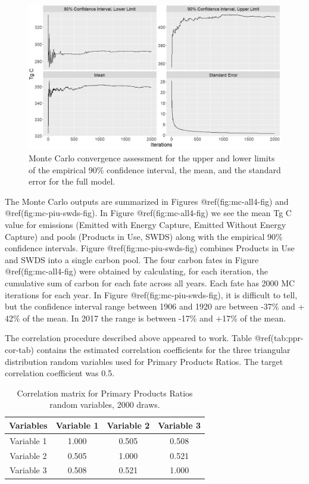 \documentclass[
  openany]{book}
\begin{document}
\begin{figure}
\includegraphics[width=1\linewidth]{images/MC_conv} \caption{Monte Carlo convergence assessment for the upper and lower limits of the empirical 90\% confidence interval, the mean, and the standard error for the full model.}\label{fig:mc-conv-fig}
\end{figure}

The Monte Carlo outputs are summarized in Figures @ref(fig:mc-all4-fig)
and @ref(fig:mc-piu-swds-fig). In Figure @ref(fig:mc-all4-fig) we see
the mean Tg C value for emissions (Emitted with Energy Capture, Emitted
Without Energy Capture) and pools (Products in Use, SWDS) along with the
empirical 90\% confidence intervals. Figure @ref(fig:mc-piu-swds-fig)
combines Products in Use and SWDS into a single carbon pool. The four
carbon fates in Figure @ref(fig:mc-all4-fig) were obtained by
calculating, for each iteration, the cumulative sum of carbon for each
fate across all years. Each fate has 2000 MC iterations for each year.
In Figure @ref(fig:mc-piu-swds-fig), it is difficult to tell, but the
confidence interval range between 1906 and 1920 are between -37\% and +
42\% of the mean. In 2017 the range is between -17\% and +17\% of the
mean.

The correlation procedure described above appeared to work. Table
@ref(tab:ppr-cor-tab) contains the estimated correlation coefficients
for the three triangular distribution random variables used for Primary
Products Ratios. The target correlation coefficient was 0.5.

\begin{table}

\caption{\label{tab:ppr-cor-tab}Correlation matrix for Primary Products Ratios random variables, 2000 draws.}
\centering
\begin{tabular}[t]{cccc}
\toprule
Variables & Variable 1 & Variable 2 & Variable 3\\
\midrule
Variable 1 & 1.000 & 0.505 & 0.508\\
Variable 2 & 0.505 & 1.000 & 0.521\\
Variable 3 & 0.508 & 0.521 & 1.000\\
\bottomrule
\end{tabular}
\end{table}
\end{document}
